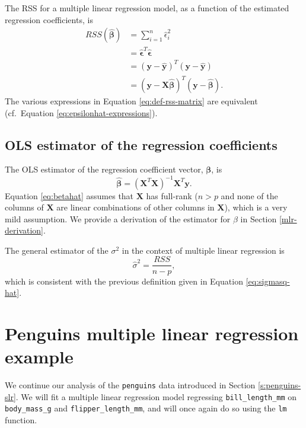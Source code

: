 \documentclass[
]{book}
\theoremstyle{definition}
\theoremstyle{definition}
\theoremstyle{definition}
\theoremstyle{definition}
\theoremstyle{remark}
\begin{document}
The RSS for a multiple linear regression model, as a function of the estimated regression coefficients, is
\[
\begin{aligned}
RSS(\hat{\boldsymbol{\beta}}) &= \sum_{i=1}^n \hat{\epsilon}_i^2 \\
&= \hat{\boldsymbol{\epsilon}}^T \hat{\boldsymbol{\epsilon}} \\
&= (\mathbf{y} - \hat{\mathbf{y}})^T (\mathbf{y} - \hat{\mathbf{y}}) \\
& = (\mathbf{y} - \mathbf{X}\hat{\boldsymbol{\beta}})^T (\mathbf{y} - \hat{\boldsymbol{\beta}}).
\end{aligned} \label{eq:def-rss-matrix}
\]
The various expressions in Equation \eqref{eq:def-rss-matrix} are equivalent (cf.~Equation \eqref{eq:epsilonhat-expressions}).

\hypertarget{ols-estimator-of-the-regression-coefficients}{%
\subsection{OLS estimator of the regression coefficients}\label{ols-estimator-of-the-regression-coefficients}}

The OLS estimator of the regression coefficient vector, \(\boldsymbol{\beta}\), is
\[
\hat{\boldsymbol{\beta}} = (\mathbf{X}^T\mathbf{X})^{-1}\mathbf{X}^T\mathbf{y}. \label{eq:betahat}
\]
Equation \eqref{eq:betahat} assumes that \(\mathbf{X}\) has full-rank (\(n>p\) and none of the columns of \(\mathbf{X}\) are linear combinations of other columns in \(\mathbf{X}\)), which is a very mild assumption. We provide a derivation of the estimator for \(\beta\) in Section \ref{mlr-derivation}.

The general estimator of the \(\sigma^2\) in the context of multiple linear regression is
\[
\hat{\sigma}^2 = \frac{RSS}{n-p},
\]
which is consistent with the previous definition given in Equation \eqref{eq:sigmasq-hat}.

\hypertarget{s:penguins-mlr}{%
\section{Penguins multiple linear regression example}\label{s:penguins-mlr}}

We continue our analysis of the \texttt{penguins} data introduced in Section \ref{s:penguins-slr}. We will fit a multiple linear regression model regressing \texttt{bill\_length\_mm} on \texttt{body\_mass\_g} and \texttt{flipper\_length\_mm}, and will once again do so using the \texttt{lm} function.
\end{document}
